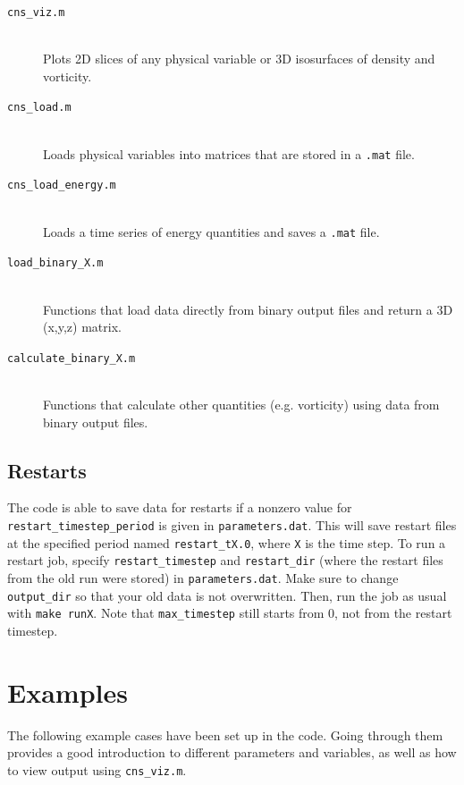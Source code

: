 \documentclass[12pt]{report}
\begin{document}
\begin{description}
\item[\texttt{cns\_viz.m}] \hfill \\Plots 2D slices of any physical variable or 3D isosurfaces of density and vorticity.
\item[\texttt{cns\_load.m}] \hfill \\Loads physical variables into matrices that are stored in a \texttt{.mat} file.
\item[\texttt{cns\_load\_energy.m}] \hfill \\Loads a time series of energy quantities and saves a \texttt{.mat} file.
\item[\texttt{load\_binary\_X.m}] \hfill \\Functions that load data directly from binary output files and return a 3D (x,y,z) matrix.
\item[\texttt{calculate\_binary\_X.m}] \hfill \\Functions that calculate other quantities (e.g. vorticity) using data from binary output files.
\end{description}

\section{Restarts}
The code is able to save data for restarts if a nonzero value for \texttt{restart\_timestep\_period} is given in \texttt{parameters.dat}. This will save restart files at the specified period named \texttt{restart\_tX.0}, where \texttt{X} is the time step. To run a restart job, specify \texttt{restart\_timestep} and \texttt{restart\_dir} (where the restart files from the old run were stored) in \texttt{parameters.dat}. Make sure to change \texttt{output\_dir} so that your old data is not overwritten. Then, run the job as usual with \texttt{make runX}. Note that \texttt{max\_timestep} still starts from 0, not from the restart timestep.

\chapter{Examples}\label{chap:examples}
The following example cases have been set up in the code. Going through them provides a good introduction to different parameters and variables, as well as how to view output using \texttt{cns\_viz.m}. 
\end{document}
